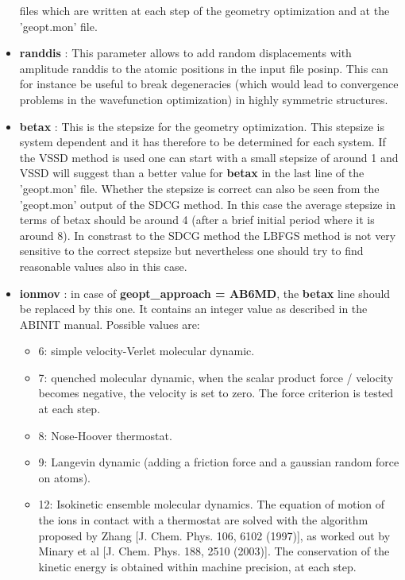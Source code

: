 \documentclass[a4paper,11pt]{report}
\begin{document}
\begin{itemize}
                                           files which are written at each step of the geometry optimization and at the 'geopt.mon' file. 
\item  {\bf randdis } : This parameter allows to add random displacements with amplitude randdis to the atomic positions in the 
                        input file posinp. This can for instance be useful to break degeneracies (which would lead to 
                        convergence problems in the wavefunction optimization) in highly symmetric structures.
\item  {\bf betax } : This is the stepsize for the geometry optimization. This stepsize is system dependent and it has therefore to be 
                      determined for each system. If the VSSD method is used one can start with a small stepsize of around 1 and 
                      VSSD will suggest than a better value for {\bf betax } in the last line of the 'geopt.mon' file. 
                      Whether the stepsize is correct can also be seen from the 'geopt.mon' output of the SDCG method. In this 
                      case the average stepsize in terms of betax should be around 4 (after a brief initial period where it is around 8).
                      In constrast to the SDCG method the LBFGS method is not very sensitive to the correct stepsize but nevertheless 
                      one should try to find reasonable values also in this case.
\item  \textbf{ionmov} : in case of {\bf geopt\_approach = AB6MD}, the {\bf betax } line should be replaced by this one. It contains an integer value as described in the ABINIT manual. Possible values are:
                         \begin{itemize}
                         \item 6: simple velocity-Verlet molecular dynamic.
                         \item 7: quenched molecular dynamic, when the scalar product force / velocity becomes negative, the velocity is set to zero. The force criterion is tested at each step.
                         \item 8: Nose-Hoover thermostat.
                         \item 9: Langevin dynamic (adding a friction force and a gaussian random force on atoms).
                         \item 12: Isokinetic ensemble molecular dynamics. The equation of motion of the ions in contact with a thermostat are solved with the algorithm proposed by Zhang [J. Chem. Phys. 106, 6102 (1997)], as worked out by Minary et al [J. Chem. Phys. 188, 2510 (2003)]. The conservation of the kinetic energy is obtained within machine precision, at each step.

\end{itemize}
\end{itemize}
\end{document}
